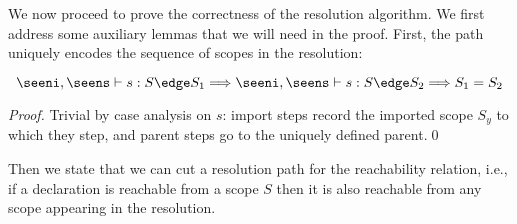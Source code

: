 
We now proceed to prove the correctness of the resolution algorithm. We first address some auxiliary lemmas that we will need in the proof.
First, the path uniquely encodes the sequence of scopes in the resolution: 
\begin{lemma} \label{lemma:transuniq}
\begin{equation*}
\seeni,\seens \vdash s : S \edge S_1 \Longrightarrow \seeni,\seens \vdash s : S \edge S_2 \Longrightarrow S_1 = S_2
\end{equation*}
\end{lemma}
\begin{proof} Trivial by case analysis on $s$: import steps record the imported scope $S_y$ to which they step,
and parent steps go to the uniquely defined parent.\qed
\end{proof}

Then we state that we can cut a resolution path for the reachability relation, i.e., if a declaration is reachable from a scope $S$ then it is also reachable from any scope appearing in the resolution.

